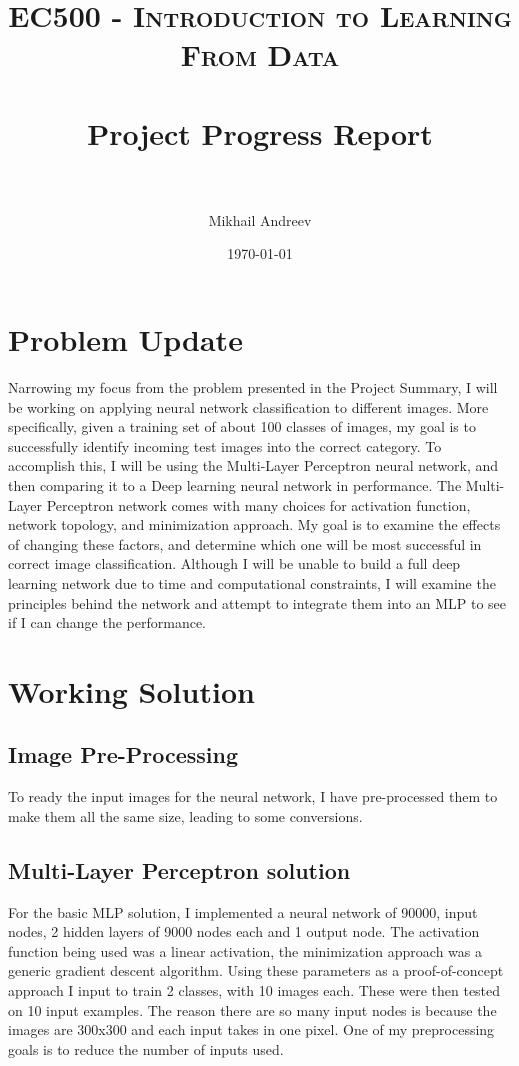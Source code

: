 \documentclass[paper=a4, fontsize=11pt]{scrartcl} %
\title{	
	\normalfont \normalsize 
	\textsc{EC500 - Introduction to Learning From Data} \\ [25pt] %
	\horrule{0.5pt} \\[0.4cm] %
	\huge Project Progress Report \\ %
	\horrule{2pt} \\[0.5cm] %
}
\author{Mikhail Andreev} %
\date{\normalsize\today} %
\numberwithin{equation}{section} %
\numberwithin{figure}{section} %
\numberwithin{table}{section} %
\begin{document}
	
	\maketitle %
	

	
	
	\section{Problem Update}
	Narrowing my focus from the problem presented in the Project Summary, I will be working on applying neural network classification to different images. More specifically, given a training set of about 100 classes of images, my goal is to successfully identify incoming test images into the correct category. To accomplish this, I will be using the Multi-Layer Perceptron neural network, and then comparing it to a Deep learning neural network in performance. The Multi-Layer Perceptron network comes with many choices for activation function, network topology, and minimization approach. My goal is to examine the effects of changing these factors, and determine which one will be most successful in correct image classification. Although I will be unable to build a full deep learning network due to time and computational constraints, I will examine the principles behind the network and attempt to integrate them into an MLP to see if I can change the performance.
	
	\section{Working Solution}
	\subsection{Image Pre-Processing}
	To ready the input images for the neural network, I have pre-processed them to make them all the same size, leading to some conversions.
	
	\subsection{Multi-Layer Perceptron solution}
	For the basic MLP solution, I implemented a neural network of 90000, input nodes, 2 hidden layers of 9000 nodes each and 1 output node. The activation function being used was a linear activation, the minimization approach was a generic gradient descent algorithm. Using these parameters as a proof-of-concept approach I input to train 2 classes, with 10 images each. These were then tested on 10 input examples. The reason there are so many input nodes is because the images are 300x300 and each input takes in one pixel. One of my preprocessing goals is to reduce the number of inputs used.
	
\end{document}
